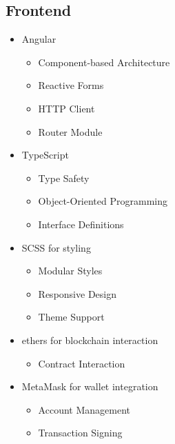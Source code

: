 \documentclass[12pt,a4paper]{article}
\begin{document}
    \subsection{Frontend}
    \begin{itemize}
        \item Angular
        \begin{itemize}
            \item Component-based Architecture
            \item Reactive Forms
            \item HTTP Client
            \item Router Module
        \end{itemize}

        \item TypeScript
        \begin{itemize}
            \item Type Safety
            \item Object-Oriented Programming
            \item Interface Definitions
        \end{itemize}

        \item SCSS for styling
        \begin{itemize}
            \item Modular Styles
            \item Responsive Design
            \item Theme Support
        \end{itemize}

        \item ethers for blockchain interaction
        \begin{itemize}
            \item Contract Interaction
        \end{itemize}

        \item MetaMask for wallet integration
        \begin{itemize}
            \item Account Management
            \item Transaction Signing
        \end{itemize}
    \end{itemize}
\end{document}
